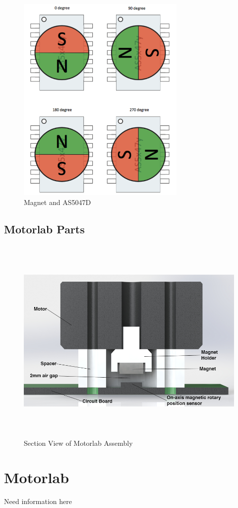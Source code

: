 \begin{figure}[htb]%
\begin{center}
    \includegraphics[height=4in]{figures/magnetic_field.png}

    \caption[Magnet and AS5047D]{Magnet and AS5047D}

    \label{magnet_rotation}
\end{center}
\end{figure}

\subsection{Motorlab Parts}
\label{makereference2.1.2} 

\begin{figure}[htb]%

    \includegraphics[height=4in]{figures/section_view_motorlab_assembly.png}

    \caption[Section View of Motorlab Assembly]{Section View of Motorlab Assembly}

    \label{section_view_motorlab}
\end{figure}


\section{Motorlab}
\label{makereference2.2} 

Need information here